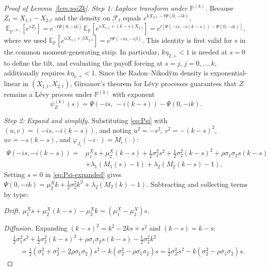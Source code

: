 \documentclass[11pt]{article}
\newcommand{\E}{\mathbb{E}}
\renewcommand{\P}{\mathbb{P}}
\theoremstyle{plain}
\theoremstyle{definition}
\theoremstyle{remark}
\begin{document}
\begin{proof}[Proof of Lemma~\ref{lem:psiZk}]\label{proof:lem:psiZk}
\textit{Step 1: Laplace transform under $\P^{(k)}$.}
Because $Z_t = X_{1,t}-X_{2,t}$ and the density on $\mathcal{F}_t$ equals
$e^{kX_{2,t}-t\Psi(0,-ik)}$,
\begin{equation}\label{eq:mgf-tilted}
\E_{\P^{(k)}}\!\left[e^{sZ_t}\right]
=
e^{-t\Psi(0,-ik)}\,
\E_\P\!\left[e^{s X_{1,t}+(k-s)X_{2,t}}\right]
=
e^{t\left[\Psi(-is,-i(k-s))-\Psi(0,-ik)\right]},
\end{equation}
where we used $\E_\P[e^{\alpha X_{1,t}+\beta X_{2,t}}]=e^{t\Psi(-i\alpha,-i\beta)}$.
This identity is first valid for $s$ in the common moment-generating strip.  In particular,
$k\eta_{2,+}<1$ is needed at $s=0$ to define the tilt, and evaluating the payoff forcing at
$s=j$, $j=0,\ldots,k$, additionally requires $k\eta_{1,+}<1$.
Since the Radon--Nikod\'ym density is exponential-linear in $(X_{1,t},X_{2,t})$, Girsanov's theorem
for L\'evy processes guarantees that $Z$ remains a L\'evy process under $\P^{(k)}$ with exponent
\begin{equation}\label{eq:psiZk-raw}
\psi_Z^{(k)}(s) = \Psi\!\left(-is,\,-i(k-s)\right)-\Psi(0,-ik).
\end{equation}

\textit{Step 2: Expand and simplify.}
Substituting \eqref{eq:Psi} with $(u,v)=(-is,-i(k-s))$, and noting
$u^2=-s^2$, $v^2=-(k-s)^2$, $uv=-s(k-s)$, and $\varphi_{J_i}(-i\cdot)=M_i(\cdot)$:
\begin{equation}\label{eq:Psi-expanded}
\begin{aligned}
\Psi(-is,-i(k-s))
={}&\mu_1^X s + \mu_2^X(k-s)
+\tfrac12\sigma_1^2 s^2+\tfrac12\sigma_2^2(k-s)^2+\rho\sigma_1\sigma_2 s(k-s)\\
&+\lambda_1(M_1(s)-1)+\lambda_2(M_2(k-s)-1).
\end{aligned}
\end{equation}
Setting $s=0$ in \eqref{eq:Psi-expanded} gives
$\Psi(0,-ik)=\mu_2^X k + \tfrac12\sigma_2^2 k^2 + \lambda_2(M_2(k)-1)$.
Subtracting and collecting terms by type:

\smallskip
\noindent\textit{Drift.}
$\mu_1^X s + \mu_2^X(k-s) - \mu_2^X k
= (\mu_1^X-\mu_2^X)s$.

\smallskip
\noindent\textit{Diffusion.}
Expanding $(k-s)^2 = k^2-2ks+s^2$ and $(k-s) = k-s$:
\begin{align*}
&\tfrac12\sigma_1^2 s^2+\tfrac12\sigma_2^2(k-s)^2+\rho\sigma_1\sigma_2 s(k-s)
-\tfrac12\sigma_2^2 k^2\\
&\quad =\tfrac12(\sigma_1^2+\sigma_2^2-2\rho\sigma_1\sigma_2)s^2
-k(\sigma_2^2-\rho\sigma_1\sigma_2)s
= \tfrac12\sigma_Z^2 s^2 - k(\sigma_2^2-\rho\sigma_1\sigma_2)s.
\end{align*}


\end{proof}
\end{document}
